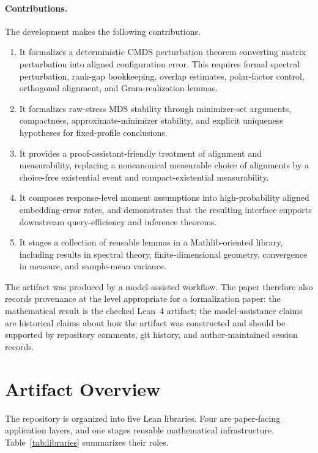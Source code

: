 \documentclass[11pt]{article}
\newcommand{\Lean}{Lean~4\xspace}
\newcommand{\Mathlib}{Mathlib\xspace}
\begin{document}
\paragraph{Contributions.}
The development makes the following contributions.
\begin{enumerate}[leftmargin=*]
  \item It formalizes a deterministic CMDS perturbation theorem converting
  matrix perturbation into aligned configuration error.  This requires formal
  spectral perturbation, rank-gap bookkeeping, overlap estimates, polar-factor
  control, orthogonal alignment, and Gram-realization lemmas.
  \item It formalizes raw-stress MDS stability through minimizer-set arguments,
  compactness, approximate-minimizer stability, and explicit uniqueness
  hypotheses for fixed-profile conclusions.
  \item It provides a proof-assistant-friendly treatment of alignment and
  measurability, replacing a noncanonical measurable choice of alignments by a
  choice-free existential event and compact-existential measurability.
  \item It composes response-level moment assumptions into high-probability
  aligned embedding-error rates, and demonstrates that the resulting interface
  supports downstream query-efficiency and inference theorems.
  \item It stages a collection of reusable lemmas in a \Mathlib-oriented
  library, including results in spectral theory, finite-dimensional geometry,
  convergence in measure, and sample-mean variance.
\end{enumerate}

The artifact was produced by a model-assisted workflow.  The paper therefore
also records provenance at the level appropriate for a formalization paper: the
mathematical result is the checked \Lean artifact; the model-assistance claims
are historical claims about how the artifact was constructed and should be
supported by repository comments, git history, and author-maintained session
records.

\section{Artifact Overview}

The repository is organized into five Lean libraries.  Four are paper-facing
application layers, and one stages reusable mathematical infrastructure.
Table~\ref{tab:libraries} summarizes their roles.
\end{document}
